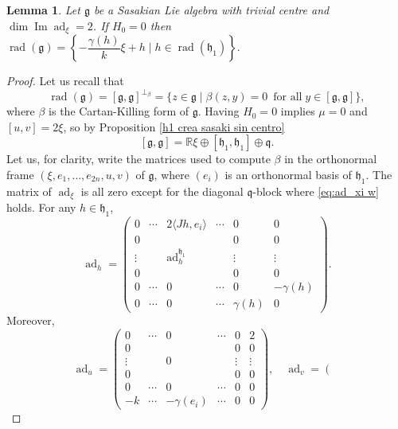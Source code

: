 \documentclass[10pt,a4paper]{amsart}
\newtheorem{lemma}{Lemma}
\renewcommand{\Im}{\operatorname{Im}}
\def\R{\mathbb{R}}
\def\ad{\operatorname{ad}}
\def\g{\mathfrak{g}}
\def\h{\mathfrak{h}}
\def\q{\mathfrak{q}}
\def\rad{\operatorname{rad}}
\begin{document}
\begin{lemma}\label{lemma: radical}
Let $\g$ be a Sasakian Lie algebra with trivial centre and $\dim \Im \ad_{\xi}=2$. If $H_0=0$ then 
$\rad(\g)= \left\{ -\dfrac{\gamma(h)}{k} \xi+h \mid  h\in \rad(\h_1) \right\}.$
\end{lemma}

\begin{proof}
Let us recall that 
\begin{equation*}\label{radical formula}
       \rad(\g)=[\g,\g]^{\perp _{\beta}}=\{z \in \g \mid \beta(z, y)=0 \, \text{ for all}\; y \in [\g,\g]\},
\end{equation*}
where $\beta$ is the Cartan-Killing form of $\g$.  
 Having $H_0=0$ implies $\mu=0$ and $[u,v]=2\xi$, so by Proposition \ref{h1 crea sasaki sin centro} 
\begin{equation}\label{conmutador de no soluble}
    [\g,\g]=\R\xi \oplus [\h_1, \h_1] \oplus {\q}. 
\end{equation}
Let us, for clarity, write the matrices used to compute $\beta$ in the orthonormal frame $(\xi, e_1,\ldots, e_{2n},u,v)$ of $\g$, where $(e_i)$ is an orthonormal basis of $\h_1$. 
The matrix of $\ad_{\xi}$ is all zero except for the diagonal ${\q}$-block where 
\eqref{eq:ad_xi w} holds.
For any $h\in\h_1$, 
\[
\ad_{h}=
\left(\begin{array}{c|ccc|cc}
          0  &\cdots & 2\langle Jh,e_i\rangle & \cdots &0&0 \\
          \hline 
          0&&& &0&0\\
          \vdots&&\ad^{\h_1}_h&&\vdots&\vdots\\
          0&&&&0&0\\
          \hline
       0 & \cdots & 0 & \cdots &0 & -\gamma(h) \\
        0 & \cdots & 0 & \cdots &\gamma(h) & 0
        \end{array}\right).
\]
Moreover,
\[
\ad_{u}=
\left(\begin{array}{c|ccc|cc}
          0  &\cdots & 0 & \cdots&0&2 \\
          \hline 
          0&&& &0&0\\
          \vdots&&0&&\vdots&\vdots\\
          0&&&&0&0\\
          \hline
       0 & \cdots & 0 & \cdots&0 & 0 \\
        -k &  \cdots & -\gamma(e_i) &  \cdots
        &0 & 0
        \end{array}\right), \quad 
\ad_{v}=
\left(\begin{array}{c|ccc|cc}

\end{array}\]
\end{proof}
\end{document}
